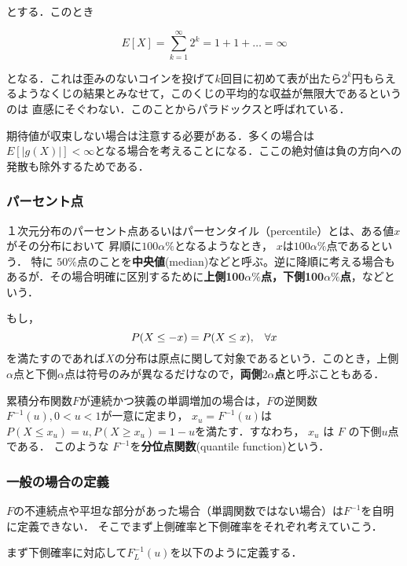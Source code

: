 \documentclass[12pt,a4j,draft]{jarticle}
\numberwithin{equation}{section}
\theoremstyle{break}
\newcommand{\inv}[1]{#1^{-1}}
\begin{document}
とする．このとき

\begin{equation}
    E[X] = \sum_{k=1}^{\infty} 2^k = 1 + 1 + \ldots = \infty
\end{equation}

となる．これは歪みのないコインを投げて$k$回目に初めて表が出たら$2^k$円もらえるようなくじの結果とみなせて，このくじの平均的な収益が無限大であるというのは
直感にそぐわない．このことからパラドックスと呼ばれている．

期待値が収束しない場合は注意する必要がある．多くの場合は$E[|g(X)|] < \infty$となる場合を考えることになる．ここの絶対値は負の方向への発散も除外するためである．

\subsubsection{パーセント点}

１次元分布のパーセント点あるいはパーセンタイル（percentile）とは、ある値$x$がその分布において 昇順に$100 \alpha \%$となるようなとき， $x$は$100 \alpha \%$点であるという．
特に $50\%$点のことを\textbf{中央値}(median)などと呼ぶ。逆に降順に考える場合もあるが．その場合明確に区別するために\textbf{上側100$\alpha\%$点，下側100$\alpha\%$点}，などという．

もし，
\begin{equation}
    P(X \leq -x) = P(X \leq x), \hspace{3mm} \forall x
    \label{eq:symmetry-distribution-1}
\end{equation}
を満たすのであれば$X$の分布は原点に関して対象であるという．このとき，上側$\alpha$点と下側$\alpha$点は符号のみが異なるだけなので，\textbf{両側$2\alpha$点}と呼ぶこともある．

累積分布関数$F$が連続かつ狭義の単調増加の場合は，$F$の逆関数$F^{-1}(u), 0<u<1$が一意に定まり， $x_u = F^{-1}(u)$は $P(X \leq x_u) = u, P(X \geq x_u) = 1-u$を満たす．すなわち， $x_u$ は $F$ の下側$u$点である． このような $\inv{F}$を\textbf{分位点関数}(quantile function)という．

\subsubsection{一般の場合の定義}

$F$の不連続点や平坦な部分があった場合（単調関数ではない場合）は$\inv{F}$を自明に定義できない．
そこでまず上側確率と下側確率をそれぞれ考えていこう．

まず下側確率に対応して$\inv{F_L}(u)$を以下のように定義する．
\end{document}
